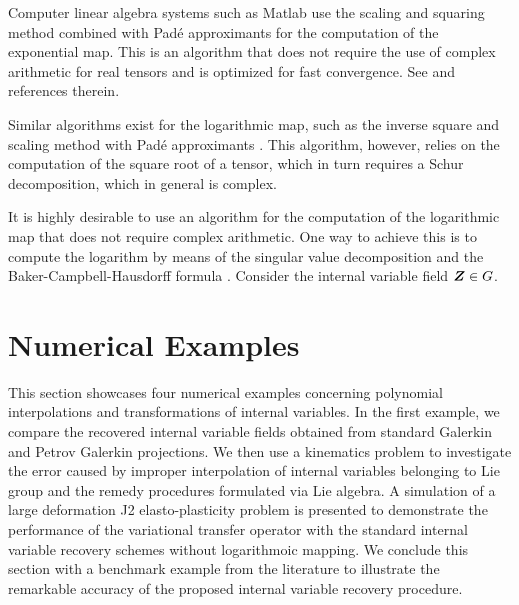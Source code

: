 \documentclass[12pt]{article}
\begin{document}
Computer linear algebra systems such as Matlab use the scaling and
squaring method combined with Pad\'{e} approximants for the
computation of the exponential map. This is an algorithm that does not
require the use of complex arithmetic for real tensors and is
optimized for fast convergence. See \citep{Higham:2005} and
references therein.

Similar algorithms exist for the logarithmic map, such as the inverse
square and scaling method with Pad\'{e} approximants
\citep{Higham:2001}. This algorithm, however, relies on the
computation of the square root of a tensor, which in turn requires a
Schur decomposition, which in general is complex.

It is highly desirable to use an algorithm for the computation of the
logarithmic map that does not require complex arithmetic. One way to
achieve this is to compute the logarithm by means of the singular
value decomposition and the Baker-Campbell-Hausdorff formula
\citep{Kosmann-Schwarzbach:2009}. Consider the internal variable field
${\boldsymbol{Z}} \in G$.

\section{Numerical Examples}
This section showcases four numerical examples concerning polynomial
interpolations and transformations of internal variables. In the first
example, we compare the recovered internal variable fields obtained
from standard Galerkin and Petrov Galerkin projections. We then use a
kinematics problem to investigate the error caused by improper
interpolation of internal variables belonging to Lie group and the
remedy procedures formulated via Lie algebra. A simulation of a large
deformation J2 elasto-plasticity problem is presented to demonstrate 
the performance of the variational transfer operator  with the 
standard internal variable recovery schemes without logarithmoic mapping. 
We conclude this section with a benchmark
example from the literature to illustrate the remarkable accuracy of
the proposed internal variable recovery procedure.
\end{document}
